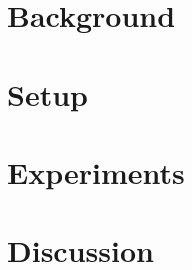 \documentclass{article}
\begin{document}
\label{sec:intro}

\section{Background}
\label{sec:background}

\section{Setup}
\label{sec:setup}

\section{Experiments}
\label{sec:experiments}

\section{Discussion}
\label{sec:discussion}



\appendix

\end{document}
